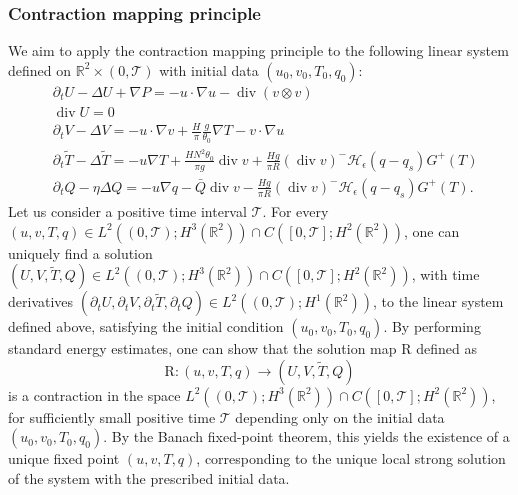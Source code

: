 \documentclass[11pt, a4paper, article,reqno,]{amsart}
\theoremstyle{remark}
\DeclareMathOperator{\dive}{div}
\numberwithin{equation}{section}
\begin{document}
\subsubsection*{Contraction mapping principle}
We aim to apply the contraction mapping principle to the following linear system defined on $\mathbb{R}^2 \times (0,\mathcal{T})$ with initial data $(u_0,v_0,T_0,q_0)$:
\begin{equation*}
    \begin{aligned}
        & \partial_t U - \Delta U + \nabla P = - u \cdot \nabla u - \dive (v \otimes v) \\
        & \dive U=0\\
        &\partial_t V - \Delta V = - u \cdot \nabla v + \frac{H}{\pi} \frac{g}{\theta_0} \nabla T - v \cdot \nabla u \\
        &\partial_t \tilde{T} - \Delta \tilde{T} = - u \nabla T + \frac{H N^2 \theta_0}{\pi g}  \dive v + \frac{H g}{\pi R}(\dive v)^- \mathcal{H}_\epsilon(q-q_s) G^+(T) \\
        & \partial_t Q- \eta \Delta Q = - u \nabla q - \bar{Q} \dive v - \frac{H g}{\pi R}(\dive v)^- \mathcal{H}_\epsilon(q-q_s) G^+(T).
    \end{aligned}
\end{equation*}
Let us consider a positive time interval $\mathcal{T}$. For every $(u,v,T,q) \in L^2((0,\mathcal{T});H^3(\mathbb{R}^2)) \cap C([0,\mathcal{T}];H^2(\mathbb{R}^2))$, one can uniquely find a solution $(U,V,\tilde{T},Q) \in L^2((0,\mathcal{T});H^3(\mathbb{R}^2)) \cap C([0,\mathcal{T}];H^2(\mathbb{R}^2))$, with time derivatives $(\partial_t U, \partial_t V, \partial_t \tilde{T}, \partial_t Q) \in L^2((0,\mathcal{T});H^1(\mathbb{R}^2))$, to the linear system defined above, satisfying the initial condition $(u_0,v_0,T_0,q_0)$. By performing standard energy estimates, one can show that the solution map $\mathrm{R}$ defined as $$\mathrm{R}: (u,v,T,q) \rightarrow (U,V,\tilde{T},Q)$$ is a contraction in the space $L^2((0,\mathcal{T});H^3(\mathbb{R}^2)) \cap C([0,\mathcal{T}];H^2(\mathbb{R}^2))$, for sufficiently small positive time $\mathcal{T}$ depending only on the initial data $(u_0,v_0,T_0,q_0)$. By the Banach fixed-point theorem, this yields the existence of a unique fixed point $(u,v,T,q)$, corresponding to the unique local strong solution of the system with the prescribed initial data.
\end{document}
